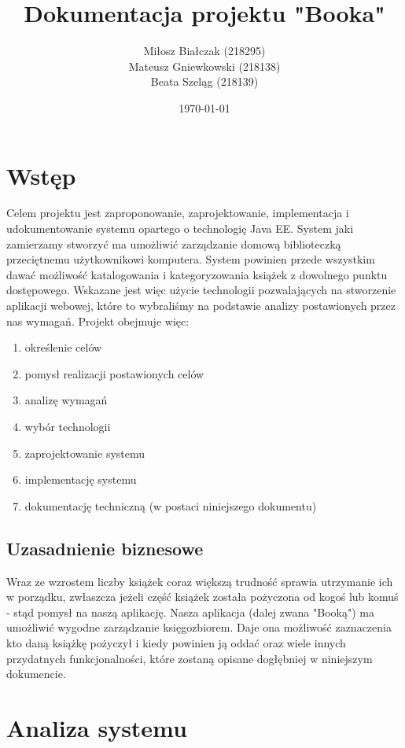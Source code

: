 \documentclass{report}
\title{Dokumentacja projektu "Booka"}
\author{Miłosz Białczak (218295)\\ Mateusz Gniewkowski (218138)\\ Beata Szeląg (218139)}
\date{\today}
\begin{document}
\setlength{\LTleft}{-20cm plus -1fill}
\setlength{\LTright}{\LTleft}
\maketitle
\tableofcontents{}



\chapter{Wstęp}

	
	Celem projektu jest zaproponowanie, zaprojektowanie, implementacja i udokumentowanie systemu opartego o technologię Java EE. System jaki zamierzamy stworzyć ma umożliwić zarządzanie domową biblioteczką przeciętnemu użytkownikowi komputera. System powinien przede wszystkim dawać możliwość katalogowania i kategoryzowania książek z dowolnego punktu dostępowego. Wskazane jest więc użycie technologii pozwalających na stworzenie aplikacji webowej, które to wybraliśmy na podstawie analizy postawionych przez nas wymagań. Projekt obejmuje więc:
	\begin{enumerate}
		\item
		określenie celów
		\item
		pomysł realizacji postawionych celów
		\item
		analizę wymagań
		\item
		wybór technologii
		\item
		zaprojektowanie systemu		
		\item
		implementację systemu 	
		\item
		dokumentację techniczną (w postaci niniejszego dokumentu)
	\end{enumerate}	

	
	\section{Uzasadnienie biznesowe}
	
	Wraz ze wzrostem liczby książek coraz większą trudność sprawia utrzymanie ich w porządku, zwłaszcza jeżeli część książek została pożyczona od kogoś lub komuś - stąd pomysł na naszą aplikację. Nasza aplikacja (dalej zwana "Booką") ma umożliwić wygodne zarządzanie księgozbiorem. Daje ona możliwość zaznaczenia kto daną książkę pożyczył i kiedy powinien ją oddać oraz wiele innych przydatnych funkcjonalności, które zostaną opisane dogłębniej w niniejszym dokumencie.

\chapter{Analiza systemu}
\end{document}
